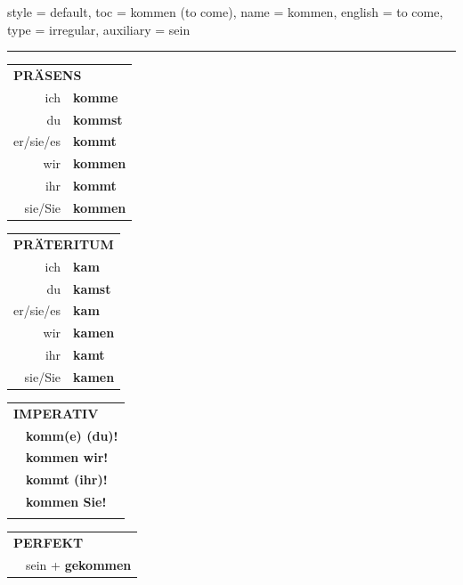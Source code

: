 \begin{verbentry}{
  style = {default},
  toc = {kommen (to come)},
  name = {kommen},
  english = {to come},
  type = {irregular},
  auxiliary = {sein}
}
 
    
     \vspace{5pt}

    \hrule
    
    \vspace{5pt}

  \begin{tabular}{rl}
     \multicolumn{2}{l}{\textbf{PRÄSENS} }\\
    ich & \textbf{komme}\\
    du & \textbf{kommst}\\
    er/sie/es & \textbf{kommt}\\
    wir & \textbf{kommen}\\
    ihr & \textbf{kommt}\\
    sie/Sie & \textbf{kommen}\\
  \end{tabular}
  \hfill
     \begin{tabular}{rl}
    \multicolumn{2}{l}{\textbf{PRÄTERITUM} }\\
    ich & \textbf{kam}\\
    du & \textbf{kamst}\\
    er/sie/es & \textbf{kam}\\
    wir & \textbf{kamen}\\
    ihr & \textbf{kamt}\\
    sie/Sie & \textbf{kamen}\\
  \end{tabular}
  \hfill
  \begin{tabular}{rl}
     \multicolumn{2}{l}{\textbf{IMPERATIV} }\\
   & \textbf{komm(e) (du)!}\\
   & \textbf{kommen wir!}\\
   & \textbf{kommt (ihr)!}\\
   & \textbf{kommen Sie!}\\
   & \vspace{10pt}
  \end{tabular}

    \vspace{10pt}

 \begin{tabular}{rl}
     \multicolumn{2}{l}{\textbf{PERFEKT}}\\
   & sein + \textbf{gekommen}\\
  \end{tabular}
\hfill
   \begin{tabular}{rl}
   

\end{tabular}
\end{verbentry}
